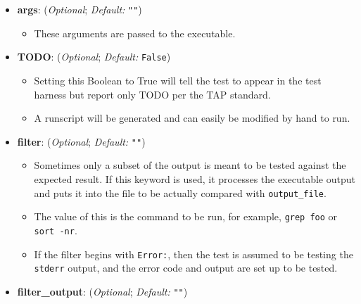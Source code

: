 \begin{itemize}
\begin{itemize}
      \end{itemize}


    \item[]  \textbf{args}: (\emph{Optional}; \emph{Default:} \lstinline{""})

      \begin{itemize}

      \item These arguments are passed to the executable.

      \end{itemize}

    \item[]  \textbf{TODO}: (\emph{Optional}; \emph{Default:} \lstinline{False})
      \begin{itemize}

      \item Setting this Boolean to True will tell the test to appear in the test harness but
      report only TODO per the TAP standard.

      \item A runscript will be generated and can easily be modified by hand to run.

      \end{itemize}

    \item[]  \textbf{filter}: (\emph{Optional}; \emph{Default:} \lstinline{""})

      \begin{itemize}

      \item Sometimes only a subset of the output is meant to be tested
      against the expected result.  If this keyword is used, it
      processes the executable output and puts it into the file
      to be actually compared with \lstinline{output_file}.

      \item The value of this is the command to be run, for example, \lstinline{grep foo} or
      \lstinline{sort -nr}.

      \item If the filter begins with \lstinline{Error:}, then the test is
            assumed to be testing the \lstinline{stderr} output, and the error code and
            output are set up to be tested.

      \end{itemize}

    \item[]  \textbf{filter\_output}: (\emph{Optional}; \emph{Default:} \lstinline{""})


\end{itemize}
